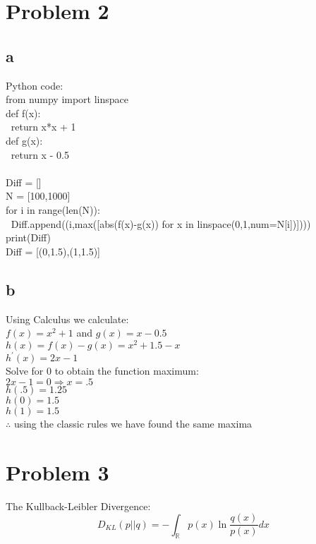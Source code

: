 \documentclass[a4paper,12pt]{article}
\begin{document}
\section{Problem 2}
\subsection{a}
Python code:\\
from numpy import linspace\\
def f(x):\\
$\>$ return x*x + 1\\
def g(x):\\
$\>$ return x - 0.5\\
\\
Diff = []\\
N = [100,1000]\\
for i in range(len(N)):\\
$\>$ Diff.append((i,max([abs(f(x)-g(x)) for x in linspace(0,1,num=N[i])])))\\
print(Diff)\\
Diff = [(0,1.5),(1,1.5)]
\subsection{b}
Using Calculus we calculate:\\
$f(x) = x^2+1$ and $g(x) = x - 0.5$\\
$h(x) = f(x)-g(x) = x^2+1.5-x$\\
$h^{'}(x) = 2x-1$\\
Solve for 0 to obtain the function maximum:\\
$2x-1 = 0 \Rightarrow x = .5$\\
$h(.5) = 1.25$\\
$h(0) = 1.5$\\
$h(1) = 1.5$\\
$\therefore$ using the classic rules we have found the same maxima

\section{Problem 3}
The Kullback-Leibler Divergence:
\begin{equation}
D_{KL}(p||q) =  -\int_{\mathbb{R}}p(x)\ln \frac{q(x)}{p(x)}dx
\end{equation}
\end{document}

